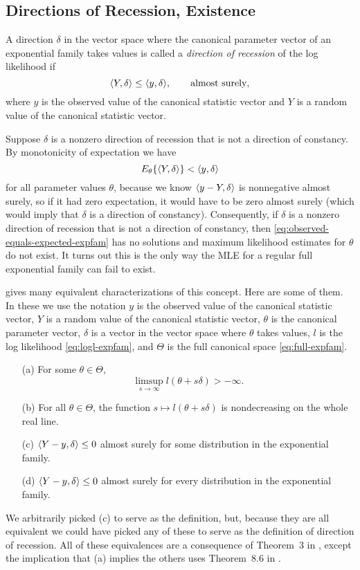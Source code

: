 \subsection{Directions of Recession, Existence}
\label{sec:direction-of-recession}

A direction $\delta$ in the vector space where the canonical parameter vector
of an exponential family takes values is called a \emph{direction of recession}
of the log likelihood if
\begin{equation} \label{eq:direction-of-recession}
   \langle Y, \delta \rangle \le \langle y, \delta \rangle, \qquad \text{almost surely},
\end{equation}
where $y$ is the observed value of the canonical statistic vector
and $Y$ is a random value of the canonical statistic vector.

Suppose $\delta$ is a nonzero direction of recession that is not a direction
of constancy.  By monotonicity of expectation we have
$$
   E_\theta\{ \langle Y, \delta \rangle \} < \langle y, \delta \rangle
$$
for all parameter values $\theta$, because we know $\langle y - Y, \delta \rangle$
is nonnegative almost surely, so if it had zero expectation, it would have
to be zero almost surely (which would imply that $\delta$ is a direction
of constancy).  Consequently, if $\delta$ is a nonzero
direction of recession that is not a direction of constancy, then
\eqref{eq:observed-equals-expected-expfam} has no solutions and maximum
likelihood estimates for $\theta$ do not exist.
It turns out this is the only way the MLE for a regular full exponential family
can fail to exist.

\citet[Theorem~3]{geyer-gdor} gives many equivalent
characterizations of this concept.  Here are some of them.
In these we use the notation $y$ is the observed value of the
canonical statistic vector, $Y$ is a random value of the
canonical statistic vector,
$\theta$ is the canonical parameter vector, $\delta$ is a vector in
the vector space where $\theta$ takes values, $l$ is the log likelihood
\eqref{eq:logl-expfam}, and $\Theta$ is the full canonical space
\eqref{eq:full-expfam}.
\begin{enumerate}
\item[(a)] For some $\theta \in \Theta$,
    $$
        \limsup_{s \to \infty} l(\theta + s \delta) > - \infty.
    $$
\item[(b)] For all $\theta \in \Theta$,
    the function $s \mapsto l(\theta + s \delta)$ is nondecreasing on the
    whole real line.
\item[(c)] $\langle Y - y, \delta \rangle \le 0$ almost surely
    for some distribution in the exponential family.
\item[(d)] $\langle Y - y, \delta \rangle \le 0$ almost surely
    for every distribution in the exponential family.
\end{enumerate}
We arbitrarily picked (c) to serve as the definition,
but, because they are all equivalent
we could have picked any of these to serve as the definition
of direction of recession.
All of these equivalences are a consequence of Theorem~{3} in
\citet{geyer-gdor}, except the implication that (a) implies the others
uses Theorem~{8.6} in \citet{rockafellar}.

